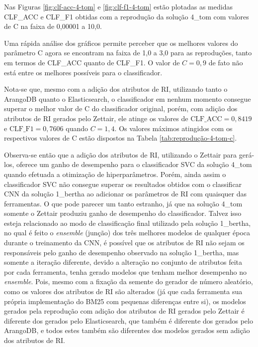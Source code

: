 			Nas Figuras \ref{fig:clf-acc-4-tom} e \ref{fig:clf-f1-4-tom} estão plotadas as medidas CLF\_ACC e CLF\_F1 obtidas com a reprodução da solução 4\_tom com valores de C na faixa de 0,00001 a 10,0.
			
			

			
			
			Uma rápida análise dos gráficos permite perceber que os melhores valores do parâmetro C agora se encontram na faixa de 1,0 a 3,0 para as reproduções, tanto em termos de CLF\_ACC quanto de CLF\_F1.
			O valor de $C = 0,9$ de fato não está entre os melhores possíveis para o classificador.
			
			Nota-se que, mesmo com a adição dos atributos de RI, utilizando tanto o ArangoDB quanto o Elasticsearch, o classificador em nenhum momento consegue superar o melhor valor de C do classificador original, porém, com adição dos atributos de RI gerados pelo Zettair, ele atinge os valores de $\text{CLF\_ACC} = 0,8419$ e $\text{CLF\_F1} = 0,7606$ quando $C = 1,4$.
			Os valores máximos atingidos com os respectivos valores de C estão dispostos na Tabela \ref{tab:reprodução-4-tom-c}.

			

			Observa-se então que a adição dos atributos de RI, utilizando o Zettair para gerá-los, oferece um ganho de desempenho para o classificador SVC da solução 4\_tom quando efetuada a otimização de hiperparâmetros.
			Porém, ainda assim o classificador SVC não consegue superar os resultados obtidos com o classificar CNN da solução 1\_bertha ao adicionar os parâmetros de RI com quaisquer das ferramentas.
			O que pode parecer um tanto estranho, já que na solução 4\_tom somente o Zettair produziu ganho de desempenho do classificador.
			Talvez isso esteja relacionado ao modo de classificação final utilizado pela solução 1\_bertha, no qual é feito o \textit{ensemble} (junção) dos três melhores modelos de qualquer época durante o treinamento da CNN, é possível que os atributos de RI não sejam os responsáveis pelo ganho de desempenho observado na solução 1\_bertha, mas somente a iteração diferente, devido a alteração no conjunto de atributos feita por cada ferramenta, tenha gerado modelos que tenham melhor desempenho no \textit{ensemble}.
			Pois, mesmo com a fixação da semente do gerador de número aleatório, como os valores dos atributos de RI são alterados (já que cada ferramenta sua própria implementação do BM25 com pequenas diferenças entre si), os modelos gerados pela reprodução com adição dos atributos de RI gerados pelo Zettair é diferente dos gerados pelo Elasticsearch, que também é diferente dos gerados pelo ArangoDB, e todos estes também são diferentes dos modelos gerados sem adição dos atributos de RI.


